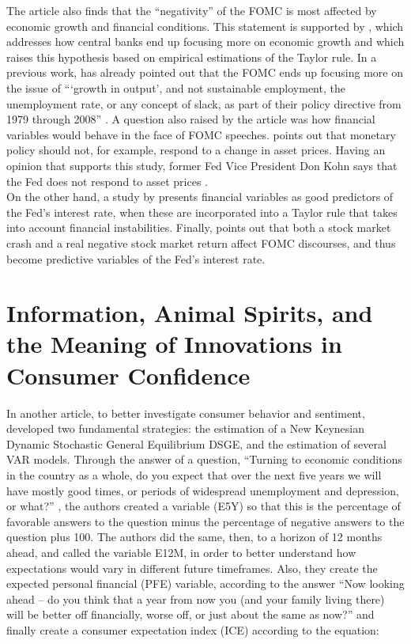 The article also finds that the ``negativity'' of the FOMC is most affected by economic growth and financial conditions. This statement is supported by \cite{walsh2003speed}, which addresses how central banks end up focusing more on economic growth and \cite{coibion2011monetary} which raises this hypothesis based on empirical estimations of the Taylor rule. In a previous work, \cite{thornton2011does} has already pointed out that the FOMC ends up focusing more on the issue of ```growth in output', and not sustainable employment, the unemployment rate, or any concept of slack, as part of their policy directive from 1979 through 2008'' \cite[p.34]{shapiro2021taking}. A question also raised by the article was how financial variables would behave in the face of FOMC speeches. \cite{bernanke2001should} points out that monetary policy should not, for example, respond to a change in asset prices. Having an opinion that supports this study, former Fed Vice President Don Kohn says that the Fed does not respond to asset prices \cite{kohn2006monetary, kohn2009monetary}.\\

On the other hand, a study by \cite{peek2015should} presents financial variables as good predictors of the Fed's interest rate, when these are incorporated into a Taylor rule that takes into account financial instabilities. Finally, \cite{cieslak2021economics} points out that both a stock market crash and a real negative stock market return affect FOMC discourses, and thus become predictive variables of the Fed's interest rate.\\

\section{Information, Animal Spirits, and the Meaning of Innovations in Consumer Confidence}

In another article, to better investigate consumer behavior and sentiment, \cite{barsky2012information} developed two fundamental strategies: the estimation of a New Keynesian Dynamic Stochastic General Equilibrium DSGE, and the estimation of several VAR models. Through the answer of a question, ``Turning to economic conditions in the country as a whole, do you expect that over the next five years we will have mostly good times, or periods of widespread unemployment and depression, or what?'' \cite[p.1347]{barsky2012information}, the authors created a variable (E5Y) so that this is the percentage of favorable answers to the question minus the percentage of negative answers to the question plus 100. The authors did the same, then, to a horizon of 12 months ahead, and called the variable E12M, in order to better understand how expectations would vary in different future timeframes. Also, they create the expected personal financial (PFE) variable, according to the answer ``Now looking ahead -- do you think that a year from now you (and your family living there) will be better off financially, worse off, or just about the same as now?'' \cite[p.1371]{barsky2012information} and finally create a consumer expectation index (ICE) according to the equation:

